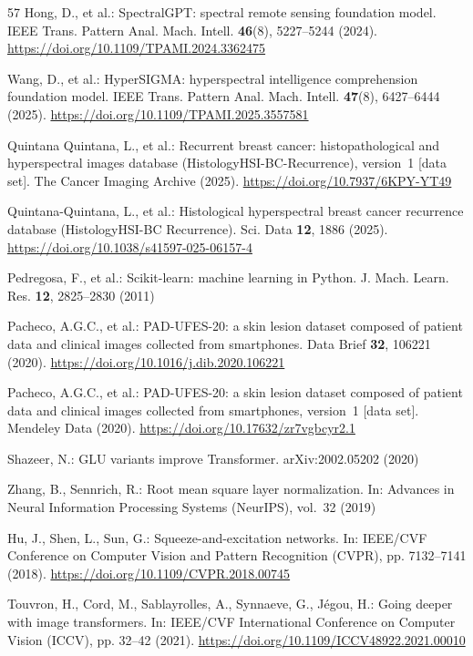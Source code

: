 \documentclass{svproc}
\begin{document}
\begin{thebibliography}{57}
Hong, D., et al.: SpectralGPT: spectral remote sensing foundation model. IEEE Trans. Pattern Anal. Mach. Intell. \textbf{46}(8), 5227--5244 (2024). \url{https://doi.org/10.1109/TPAMI.2024.3362475}

Wang, D., et al.: HyperSIGMA: hyperspectral intelligence comprehension foundation model. IEEE Trans. Pattern Anal. Mach. Intell. \textbf{47}(8), 6427--6444 (2025). \url{https://doi.org/10.1109/TPAMI.2025.3557581}

Quintana Quintana, L., et al.: Recurrent breast cancer: histopathological and hyperspectral images database (HistologyHSI-BC-Recurrence), version~1 [data set]. The Cancer Imaging Archive (2025). \url{https://doi.org/10.7937/6KPY-YT49}

Quintana-Quintana, L., et al.: Histological hyperspectral breast cancer recurrence database (HistologyHSI-BC Recurrence). Sci. Data \textbf{12}, 1886 (2025). \url{https://doi.org/10.1038/s41597-025-06157-4}

Pedregosa, F., et al.: Scikit-learn: machine learning in Python. J. Mach. Learn. Res. \textbf{12}, 2825--2830 (2011)

Pacheco, A.G.C., et al.: PAD-UFES-20: a skin lesion dataset composed of patient data and clinical images collected from smartphones. Data Brief \textbf{32}, 106221 (2020). \url{https://doi.org/10.1016/j.dib.2020.106221}

Pacheco, A.G.C., et al.: PAD-UFES-20: a skin lesion dataset composed of patient data and clinical images collected from smartphones, version~1 [data set]. Mendeley Data (2020). \url{https://doi.org/10.17632/zr7vgbcyr2.1}

Shazeer, N.: GLU variants improve Transformer. arXiv:2002.05202 (2020)

Zhang, B., Sennrich, R.: Root mean square layer normalization. In: Advances in Neural Information Processing Systems (NeurIPS), vol.~32 (2019)

Hu, J., Shen, L., Sun, G.: Squeeze-and-excitation networks. In: IEEE/CVF Conference on Computer Vision and Pattern Recognition (CVPR), pp. 7132--7141 (2018). \url{https://doi.org/10.1109/CVPR.2018.00745}

Touvron, H., Cord, M., Sablayrolles, A., Synnaeve, G., J\'{e}gou, H.: Going deeper with image transformers. In: IEEE/CVF International Conference on Computer Vision (ICCV), pp. 32--42 (2021). \url{https://doi.org/10.1109/ICCV48922.2021.00010}


\end{thebibliography}
\end{document}
